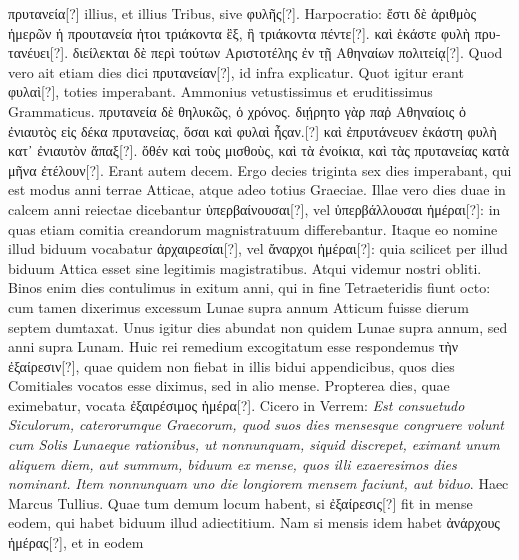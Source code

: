 \textgreek{πρυτανεία[?]} illius, et illius Tribus, sive \textgreek{φυλῆς[?]}.
%
Harpocratio: \textgreek{ἔστι δὲ ἀριθμὸς
ἡμερῶν ἡ προυτανεία ἠτοι τριάκοντα ἓξ, ἣ τριάκοντα πέντε[?]}.
\textgreek{καὶ ἑκάστε φυλὴ πρυτανέυει[?]}.
\textgreek{διείλεκται δὲ περὶ τούτων Αριστοτέλης ἐν τῇ Αθηναίων πολιτείᾳ[?]}.
Quod vero
ait etiam  dies dici \textgreek{πρυτανείαν[?]}, id infra explicatur.
Quot igitur
erant \textgreek{φυλαὶ[?]}, toties  imperabant.
Ammonius vetustissimus et eruditissimus
Grammaticus.
\textgreek{πρυτανεία δὲ θηλυκῶς, ὁ χρόνος.}
\textgreek{διῄρητο γὰρ παῤ Αθηναίοις
ὁ ἐνιαυτὸς εἰς δέκα πρυτανείας, ὅσαι καὶ φυλαὶ ἦςαν.[?]}
\textgreek{καὶ ἐπρυτάνευεν ἑκάστη φυλὴ
κατ᾽ ἐνιαυτὸν ἅπαξ[?]}.
\textgreek{ὅθέν καὶ τοὺς μισθοὺς, καὶ τὰ ἐνοίκια, καὶ τὰς πρυτανείας κατὰ
μῆνα ἐτέλουν[?]}.
Erant autem decem.
Ergo decies triginta sex dies imperabant,
qui est modus anni terrae Atticae, atque adeo totius Graeciae.
Illae
vero dies duae in calcem anni reiectae dicebantur \textgreek{ὑπερβαίνουσαι[?]},
 vel \textgreek{ὑπερβάλλουσαι
ἡμέραι[?]}: in quas etiam comitia creandorum magnistratuum
 differebantur.
Itaque eo nomine illud biduum vocabatur \textgreek{ἀρχαιρεσίαι[?]}, vel
\textgreek{ἄναρχοι ἡμέραι[?]}: quia scilicet per illud biduum
 Attica esset sine legitimis
magistratibus.
Atqui videmur nostri obliti.
Binos enim dies contulimus
in exitum anni, qui in fine Tetraeteridis fiunt octo: cum tamen
dixerimus excessum Lunae supra annum Atticum fuisse dierum septem
dumtaxat.
Unus igitur dies abundat non quidem Lunae supra annum,
sed anni supra Lunam.
Huic rei remedium excogitatum esse respondemus
\textgreek{τὴν ἐξαίρεσιν[?]}, quae quidem non fiebat in illis bidui appendicibus,
quos dies Comitiales vocatos esse diximus, sed in alio mense.
Propterea
dies, quae eximebatur, vocata \textgreek{ἐξαιρέσιμος ἡμέρα[?]}.
Cicero in Verrem: \textit{Est
consuetudo Siculorum, caterorumque Graecorum, quod suos dies mensesque
congruere volunt cum Solis Lunaeque rationibus, ut nonnunquam, siquid
discrepet, eximant unum aliquem diem, aut summum, biduum ex
mense, quos illi exaeresimos dies nominant.}
\textit{Item nonnunquam uno die longiorem
mensem faciunt, aut biduo}.
Haec Marcus Tullius.
Quae tum demum
locum habent, si \textgreek{ἐξαίρεσις[?]} fit in mense eodem,
 qui habet biduum illud
adiectitium.
Nam si mensis idem habet \textgreek{ἀνάρχους ἡμέρας[?]}, et in eodem
